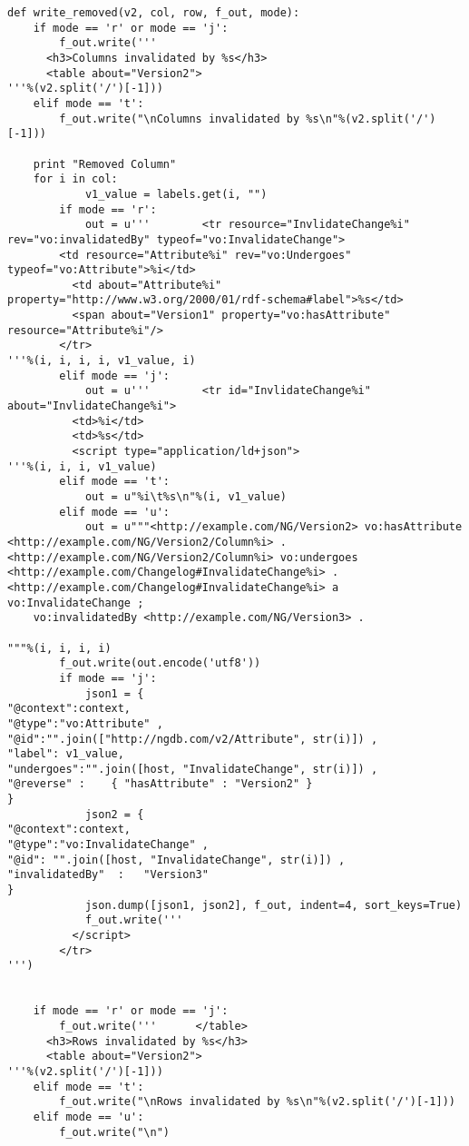 \begin{verbatim}
def write_removed(v2, col, row, f_out, mode):
	if mode == 'r' or mode == 'j':
		f_out.write('''
      <h3>Columns invalidated by %s</h3>
      <table about="Version2">
'''%(v2.split('/')[-1]))
	elif mode == 't':
		f_out.write("\nColumns invalidated by %s\n"%(v2.split('/')[-1]))

	print "Removed Column"
	for i in col:
        	v1_value = labels.get(i, "")
		if mode == 'r':
			out = u'''        <tr resource="InvlidateChange%i" rev="vo:invalidatedBy" typeof="vo:InvalidateChange">
		<td resource="Attribute%i" rev="vo:Undergoes" typeof="vo:Attribute">%i</td>
          <td about="Attribute%i" property="http://www.w3.org/2000/01/rdf-schema#label">%s</td>
          <span about="Version1" property="vo:hasAttribute" resource="Attribute%i"/>
        </tr>
'''%(i, i, i, i, v1_value, i)
		elif mode == 'j':
			out = u'''        <tr id="InvlidateChange%i" about="InvlidateChange%i">
          <td>%i</td>
          <td>%s</td>
          <script type="application/ld+json">
'''%(i, i, i, v1_value)
		elif mode == 't':
			out = u"%i\t%s\n"%(i, v1_value)
		elif mode == 'u':
			out = u"""<http://example.com/NG/Version2> vo:hasAttribute <http://example.com/NG/Version2/Column%i> .
<http://example.com/NG/Version2/Column%i> vo:undergoes <http://example.com/Changelog#InvalidateChange%i> .
<http://example.com/Changelog#InvalidateChange%i> a vo:InvalidateChange ;
	vo:invalidatedBy <http://example.com/NG/Version3> .

"""%(i, i, i, i)
		f_out.write(out.encode('utf8'))
		if mode == 'j':
			json1 = {
"@context":context,
"@type":"vo:Attribute" ,
"@id":"".join(["http://ngdb.com/v2/Attribute", str(i)]) ,
"label": v1_value,
"undergoes":"".join([host, "InvalidateChange", str(i)]) ,
"@reverse" :    { "hasAttribute" : "Version2" }
}
			json2 = {
"@context":context,
"@type":"vo:InvalidateChange" ,
"@id": "".join([host, "InvalidateChange", str(i)]) ,
"invalidatedBy"  :   "Version3"
}
			json.dump([json1, json2], f_out, indent=4, sort_keys=True)
			f_out.write('''
          </script>
        </tr>
''')
			

	if mode == 'r' or mode == 'j':
		f_out.write('''      </table>
      <h3>Rows invalidated by %s</h3>
      <table about="Version2">
'''%(v2.split('/')[-1]))
	elif mode == 't':
		f_out.write("\nRows invalidated by %s\n"%(v2.split('/')[-1]))
	elif mode == 'u':
		f_out.write("\n")


\end{verbatim}
